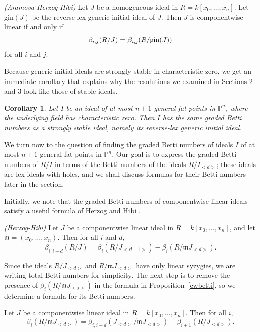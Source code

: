 \documentclass{article}
\begin{document}
\begin{theorem}
\label{ginbetti}
\emph{(Aramova-Herzog-Hibi)} Let $J$ be a homogeneous ideal in $R=k[x_0,\dots,x_n]$. Let gin$(J)$ be the reverse-lex generic initial ideal of $J$. Then $J$ is componentwise linear if and only if \[ \beta_{i,j}(R/J) = \beta_{i,j}(R/ \hbox{gin}(J)) \] for all $i$ and $j$.
\end{theorem}

Because generic initial ideals are strongly stable in characteristic zero, we get an immediate corollary that explains why the resolutions we examined in Sections 2 and 3 look like those of stable ideals.

\newtheorem{corollary}[definition]{Corollary}
\begin{corollary}
\label{cwgin}
Let $I$ be an ideal of at most $n+1$ general fat points in $\mathbb P^n$, where the underlying field has characteristic zero. Then $I$ has the same graded Betti numbers as a strongly stable ideal, namely its reverse-lex generic initial ideal.
\end{corollary}

We turn now to the question of finding the graded Betti numbers of ideals $I$ of at most $n+1$ general fat points in $\mathbb P^n$. Our goal is to express the graded Betti numbers of $R/I$ in terms of the Betti numbers of the ideals $R/I_{<d>}$; these ideals are lex ideals with holes, and we shall discuss formulas for their Betti numbers later in the section. 

Initially, we note that the graded Betti numbers of componentwise linear ideals satisfy a useful formula of Herzog and Hibi \cite{HerzogHibi}.

\begin{proposition}
\label{cwbetti}
\emph{(Herzog-Hibi)} Let $J$ be a componentwise linear ideal in $R=k[x_0,\dots,x_n]$, and let $\mathfrak m = (x_0,\dots,x_n)$. Then for all $i$ and $d$, \[\beta_{i,i+d}(R/J) = \beta_i(R/J_{<d+1>}) - \beta_i(R/\mathfrak mJ_{<d>}).\]
\end{proposition}

Since the ideals $R/J_{<d>}$ and $R/\mathfrak mJ_{<d>}$ have only linear syzygies, we are writing total Betti numbers for simplicity. The next step is to remove the presence of $\beta_i(R/\mathfrak mJ_{<j>})$ in the formula in Proposition~\ref{cwbetti}, so we determine a formula for its Betti numbers.

\begin{proposition}
\label{mbetti}
Let $J$ be a componentwise linear ideal in $R=k[x_0,\dots,x_n]$. Then for all $i$, \[ \beta_i(R/\mathfrak mJ_{<d>}) = \beta_{i,i+d}(J_{<d>}/\mathfrak m J_{<d>})-\beta_{i+1}(R/J_{<d>}).\]
\end{proposition}
\end{document}
